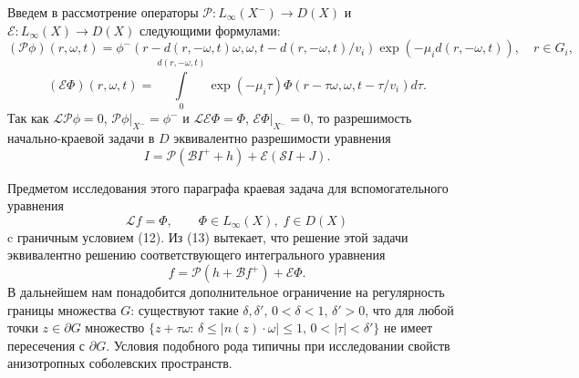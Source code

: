 \documentclass[12pt,reqno]{report}
\begin{document}
Введем в рассмотрение операторы $\mathcal P: L_{\infty}(X^-) \to D(X)$ и $\mathcal E:  L_{\infty}(X) \to D(X)$ следующими формулами:
$$
(\mathcal P
\phi)(r,\omega,t)=\phi^-(r-d(r,-\omega,t)\omega,\omega,t-d(r,-\omega,t)/v_i)
\exp \left(- \mu_i d(r,-\omega,t)\right), \quad
r\in G_i,
$$
$$
(\mathcal E\Phi)(r,\omega,t)=\int \limits^{d(r,-\omega,t)}_0 \exp
\left(- \mu_i \tau\right) \Phi(r-\tau
\omega,\omega,t-\tau/v_i)d\tau.
$$
Так как ${\mathcal L} {\mathcal P} \phi =0$, ${\mathcal P}
\phi|_{X^-} =\phi^-$ и ${\mathcal L} {\mathcal E} \Phi = \Phi$,
${\mathcal E} \Phi|_{X^-}=0$, то разрешимость начально-краевой
задачи в $D$ эквивалентно разрешимости уравнения
\begin{equation}
I= \mathcal P(\mathcal B I^+ +h ) + \mathcal E ( \mathcal S I +
J).
\end{equation}


Предметом исследования  этого параграфа краевая задача для  вспомогательного уравнения 
\begin{equation}
\mathcal Lf =\Phi, \qquad \Phi \in L_{\infty}(X), \; f \in D(X)
\end{equation}
c граничным условием (12). Из (13) вытекает, что решение этой задачи эквивалентно решению соответствующего интегрального уравнения 
\begin{equation}
f= \mathcal P (h+\mathcal B f^+) +{\mathcal E}\Phi.
\end{equation}
В дальнейшем нам понадобится дополнительное ограничение на регулярность границы множества $G$: существуют такие $\delta,\delta',\, 0< \delta < 1,\, \delta'>0$, что для любой точки $z \in \partial G$ множество 
$\{z+\tau\omega:\, \delta \leq |n(z)\cdot \omega| \leq 1,\, 0 <|\tau| <\delta'\}$ не имеет пересечения с $\partial G$. 
Условия подобного рода  типичны при исследовании свойств анизотропных соболевских пространств. 
\end{document}
